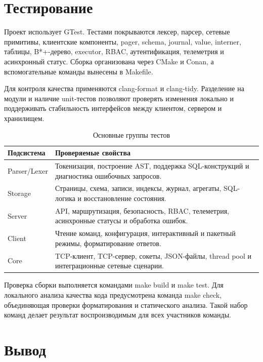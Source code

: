 \documentclass[a4paper,14pt]{extarticle}
\renewcommand{\texttt}[1]{\textrm{#1}}
\begin{document}
\section{Тестирование}

Проект использует GTest. Тестами покрываются лексер, парсер, сетевые примитивы, клиентские компоненты, pager, schema, journal, value, interner, таблицы, B*+-дерево, executor, RBAC, аутентификация, телеметрия и асинхронный статус. Сборка организована через CMake и Conan, а вспомогательные команды вынесены в Makefile.

Для контроля качества применяются clang-format и clang-tidy. Разделение на модули и наличие unit-тестов позволяют проверять изменения локально и поддерживать стабильность интерфейсов между клиентом, сервером и хранилищем.

\begin{table}[H]
\caption{Основные группы тестов}
\centering
\small
\begin{tabularx}{\textwidth}{>{\raggedright\arraybackslash}p{}Y}
\toprule
Подсистема & Проверяемые свойства \\
\midrule
Parser/Lexer & Токенизация, построение AST, поддержка SQL-конструкций и диагностика ошибочных запросов. \\
Storage & Страницы, схема, записи, индексы, журнал, агрегаты, SQL-логика и восстановление состояния. \\
Server & API, маршрутизация, безопасность, RBAC, телеметрия, асинхронные статусы и обработка ошибок. \\
Client & Чтение команд, конфигурация, интерактивный и пакетный режимы, форматирование ответов. \\
Core & TCP-клиент, TCP-сервер, сокеты, JSON-файлы, thread pool и интеграционные сетевые сценарии. \\
\bottomrule
\end{tabularx}
\end{table}

Проверка сборки выполняется командами \texttt{make build} и \texttt{make test}. Для локального анализа качества кода предусмотрена команда \texttt{make check}, объединяющая проверки форматирования и статического анализа. Такой набор команд делает результат воспроизводимым для всех участников команды.

\section*{Вывод}
\end{document}
